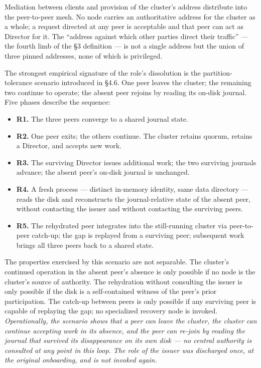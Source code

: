 \documentclass[
]{article}
\newcounter{none} %
\providecommand{\tightlist}{%
  \setlength{\itemsep}{0pt}\setlength{\parskip}{0pt}}
\begin{document}
Mediation between clients and provision of the cluster's address
distribute into the peer-to-peer mesh. No node carries an authoritative
address for the cluster as a whole; a request directed at any peer is
acceptable and that peer can act as Director for it. The ``address
against which other parties direct their traffic'' --- the fourth limb
of the §3 definition --- is not a single address but the union of three
pinned addresses, none of which is privileged.

The strongest empirical signature of the role's dissolution is the
partition-tolerance scenario introduced in §4.6. One peer leaves the
cluster; the remaining two continue to operate; the absent peer rejoins
by reading its on-disk journal. Five phases describe the sequence:

\begin{itemize}
\tightlist
\item
  \textbf{R1.} The three peers converge to a shared journal state.
\item
  \textbf{R2.} One peer exits; the others continue. The cluster retains
  quorum, retains a Director, and accepts new work.
\item
  \textbf{R3.} The surviving Director issues additional work; the two
  surviving journals advance; the absent peer's on-disk journal is
  unchanged.
\item
  \textbf{R4.} A fresh process --- distinct in-memory identity, same
  data directory --- reads the disk and reconstructs the
  journal-relative state of the absent peer, without contacting the
  issuer and without contacting the surviving peers.
\item
  \textbf{R5.} The rehydrated peer integrates into the still-running
  cluster via peer-to-peer catch-up; the gap is replayed from a
  surviving peer; subsequent work brings all three peers back to a
  shared state.
\end{itemize}

The properties exercised by this scenario are not separable. The
cluster's continued operation in the absent peer's absence is only
possible if no node is the cluster's source of authority. The
rehydration without consulting the issuer is only possible if the disk
is a self-contained witness of the peer's prior participation. The
catch-up between peers is only possible if any surviving peer is capable
of replaying the gap; no specialized recovery node is invoked.
\emph{Operationally, the scenario shows that a peer can leave the
cluster, the cluster can continue accepting work in its absence, and the
peer can re-join by reading the journal that survived its disappearance
on its own disk --- no central authority is consulted at any point in
this loop. The role of the issuer was discharged once, at the original
onboarding, and is not invoked again.}
\end{document}
